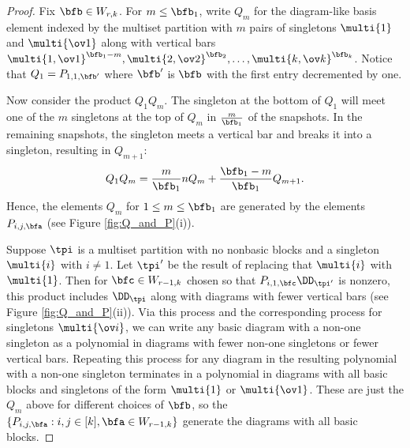 \begin{proof}
    Fix $\bfb\in W_{r,k}$. For $m\leq\bfb_1$, write $Q_m$ for the diagram-like basis element indexed by the multiset partition with $m$ pairs of singletons $\multi{1}$ and $\multi{\ov1}$ along with vertical bars $\multi{1,\ov1}^{\bfb_1-m},\multi{2,\ov2}^{\bfb_2},\dots,\multi{k,\ov k}^{\bfb_k}$. Notice that $Q_1=P_{1,1,\bfb'}$ where $\bfb'$ is $\bfb$ with the first entry decremented by one.

    Now consider the product $Q_1Q_m$. The singleton at the bottom of $Q_1$ will meet one of the $m$ singletons at the top of $Q_m$ in $\frac{m}{\bfb_1}$ of the snapshots. In the remaining snapshots, the singleton meets a vertical bar and breaks it into a singleton, resulting in $Q_{m+1}$: \[Q_1Q_m=\frac{m}{\bfb_1}nQ_m+\frac{\bfb_1-m}{\bfb_1}Q_{m+1}.\] Hence, the elements $Q_m$ for $1\leq m\leq \bfb_1$ are generated by the elements $P_{i,j,\bfa}$ (see Figure \ref{fig:Q_and_P}(i)).

    Suppose $\tpi$ is a multiset partition with no nonbasic blocks and a singleton $\multi{i}$ with $i\neq 1$. Let $\tpi'$ be the result of replacing that $\multi{i}$ with $\multi{1}$. Then for $\bfc\in W_{r-1,k}$ chosen so that $P_{i,1,\bfc}\DD_{\tpi'}$ is nonzero, this product includes $\DD_\tpi$ along with diagrams with fewer vertical bars (see Figure \ref{fig:Q_and_P}(ii)). Via this process and the corresponding process for singletons $\multi{\ov i}$, we can write any basic diagram with a non-one singleton as a polynomial in diagrams with fewer non-one singletons or fewer vertical bars. Repeating this process for any diagram in the resulting polynomial with a non-one singleton terminates in a polynomial in diagrams with all basic blocks and singletons of the form $\multi{1}$ or $\multi{\ov 1}$. These are just the $Q_m$ above for different choices of $\bfb$, so the $\{P_{i,j,\bfa}:i,j\in[k],\bfa\in W_{r-1,k}\}$ generate the diagrams with all basic blocks.
\end{proof}


